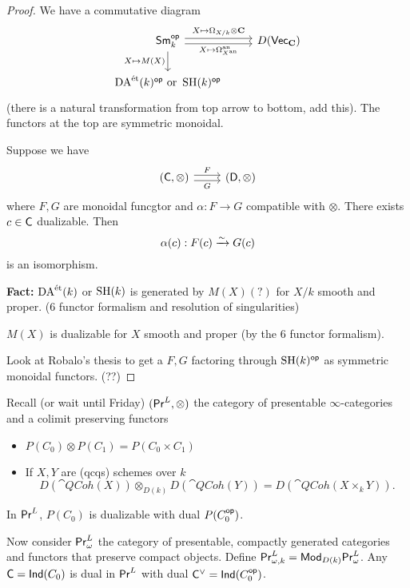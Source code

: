 \begin{proof}
	We have a commutative diagram
	\begin{equation}
	\begin{tikzcd}
		\cat{Sm}_k\op \ar[r,shift left, "X\mapsto \Omega_{X /k}\otimes\bb{C}"] \ar[r,shift right, "X\mapsto \Omega_{X\an}\an"'] \ar[d,"X\mapsto M(X)"'] & D(\cat{Vec}_{\bb{C}}) \\
		\DAet(k)\op\text{ or }\SH(k)\op
	\end{tikzcd}
	\end{equation}
	(there is a natural transformation from top arrow to bottom, add this). The functors at the top are symmetric monoidal.

	\begin{lemma}
		Suppose we have
		\begin{equation}
		\begin{tikzcd}
			(\C,\otimes) \ar[r,shift left,"F"] \ar[r,shift right,"G"'] & (\cat{D},\otimes)
		\end{tikzcd}
		\end{equation}
		where $F,G$ are monoidal funcgtor and $\alpha:F\to G$ compatible with $\otimes$. There exists $c\in \mathsf{C}$ dualizable. Then
		\[
		\alpha(c): F(c) \xrightarrow{\sim} G(c)
		\]
		is an isomorphism.
	\end{lemma}
	\textbf{Fact:} $\operatorname{DA}^{\text{\'et}}(k)$ or $\operatorname{SH}(k)$ is generated by $M(X)(?)$ for $X /k$ smooth and proper. (6 functor formalism and resolution of singularities)

	$M(X)$ is dualizable for $X$ smooth and proper (by the 6 functor formalism).

	Look at Robalo's thesis to get a $F,G$ factoring through $\operatorname{SH}(k)^\mathsf{op}$ as symmetric monoidal functors. (??)
\end{proof}
Recall (or wait until Friday) $(\mathsf{Pr}^L,\otimes)$ the category of presentable $\infty$-categories and a colimit preserving functors
\begin{itemize}
	\item $P(C_0)\otimes P(C_1) = P(C_0\times C_1)$ 
	\item If $X,Y$ are (qcqs) schemes over $k$
		\[
			D(\cat{QCoh}(X)) \otimes_{D(k)}D(\cat{QCoh}(Y)) = D(\cat{QCoh}(X\times_k Y)).
		\] 
\end{itemize}
\begin{example}
	In $\mathsf{Pr}^L$, $P(C_0)$ is dualizable with dual $P(C_0^\mathsf{op})$.
\end{example}

Now consider $\mathsf{Pr}^L_{\omega}$ the category of presentable, compactly generated categories and functors that preserve compact objects. Define $\mathsf{Pr}^L_{\omega,k} = \mathsf{Mod}_{D(k)}\mathsf{Pr}^L_\omega$. Any $\mathsf{C}=\mathsf{Ind}(C_0)$ is dual in $\mathsf{Pr}^L$ with dual $\mathsf{C}^{\vee}=\mathsf{Ind}(C_0^\mathsf{op})$.

